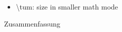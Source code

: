 \label{sec:abstract}
%
\begin{itemize}
   \item \textbackslash tum{}: size in smaller math mode %
\end{itemize}
%
\vspace*{20mm}
%
{Zusammenfassung}
\label{sec:abstract-ger}
%
